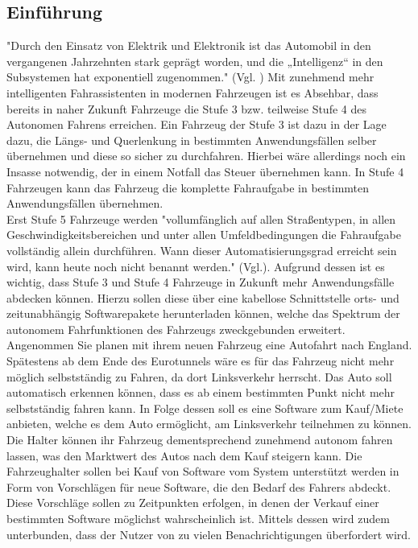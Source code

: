 \subsection{Einführung}
"Durch den Einsatz von Elektrik und Elektronik ist das Automobil in den vergangenen
Jahrzehnten stark geprägt worden, und die „Intelligenz“ in den Subsystemen hat exponentiell zugenommen." (Vgl. \cite[S. 1]{uniStuttgart}) Mit zunehmend mehr intelligenten Fahrassistenten in modernen Fahrzeugen ist es Absehbar, dass bereits in naher Zukunft Fahrzeuge die Stufe 3 bzw. teilweise Stufe 4 des Autonomen Fahrens erreichen. Ein Fahrzeug der Stufe 3 ist dazu in der Lage dazu, die Längs- und Querlenkung in bestimmten Anwendungsfällen selber übernehmen und diese so sicher zu durchfahren. Hierbei wäre allerdings noch ein Insasse notwendig, der in einem Notfall das Steuer übernehmen kann. In Stufe 4 Fahrzeugen kann das Fahrzeug die komplette Fahraufgabe in bestimmten Anwendungsfällen übernehmen.\cite[S.\, 14]{vda}\\

Erst Stufe 5 Fahrzeuge werden "vollumfänglich auf allen Straßentypen, in allen Geschwindigkeitsbereichen und unter allen Umfeldbedingungen die Fahraufgabe vollständig allein durchführen. Wann dieser Automatisierungsgrad erreicht sein wird, kann heute noch nicht benannt werden." (Vgl.\cite[S. 14]{vda}). Aufgrund dessen ist es wichtig, dass Stufe 3 und Stufe 4 Fahrzeuge in Zukunft mehr Anwendungsfälle abdecken können. Hierzu sollen diese über eine kabellose Schnittstelle orts- und zeitunabhängig Softwarepakete herunterladen können, welche das Spektrum der autonomem Fahrfunktionen des Fahrzeugs zweckgebunden erweitert. Angenommen Sie planen mit ihrem neuen Fahrzeug eine Autofahrt nach England. Spätestens ab dem Ende des Eurotunnels wäre es für das Fahrzeug nicht mehr möglich selbstständig zu Fahren, da dort Linksverkehr herrscht. Das Auto soll automatisch erkennen können, dass es ab einem bestimmten Punkt nicht mehr selbstständig fahren kann. In Folge dessen soll es eine Software zum Kauf/Miete anbieten, welche es dem Auto ermöglicht, am Linksverkehr teilnehmen zu können. Die Halter können ihr Fahrzeug dementsprechend zunehmend autonom fahren lassen, was den Marktwert des Autos nach dem Kauf steigern kann. Die Fahrzeughalter sollen bei Kauf von Software vom System unterstützt werden in Form von Vorschlägen für neue Software, die den Bedarf des Fahrers abdeckt. Diese Vorschläge sollen zu Zeitpunkten erfolgen, in denen der Verkauf einer bestimmten Software möglichst wahrscheinlich ist. Mittels dessen wird zudem unterbunden, dass der Nutzer von zu vielen Benachrichtigungen überfordert wird.\\

